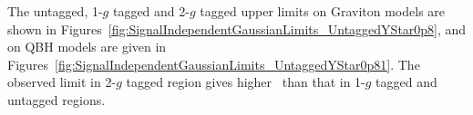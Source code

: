 


The untagged, 1-$g$ tagged and 2-$g$ tagged upper limits on Graviton models are shown in Figures~\ref{fig:SignalIndependentGaussianLimits_UntaggedYStar0p8}, and on QBH models are given in Figures~\ref{fig:SignalIndependentGaussianLimits_UntaggedYStar0p81}. The observed limit in 2-$g$ tagged region gives higher \mjj\ than that in 1-$g$ tagged and untagged regions.


